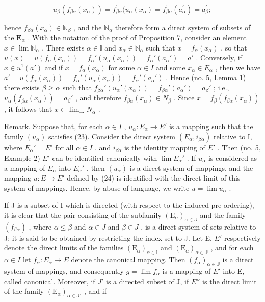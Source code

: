 \[
u _ {\beta} (f _ {\beta \alpha} (x _ {\alpha})) = f _ {\beta \alpha} ^ {\prime} (u _ {\alpha} (x _ {\alpha}) = f _ {\beta \alpha} ^ {\prime} (a _ {\alpha} ^ {\prime}) = a _ {\beta} ^ {\prime};
\]

hence \(f_{\beta \alpha}(x_{\alpha}) \in \mathbb{N}_{\beta}\) , and the \(\mathbb{N}_{\alpha}\) therefore form a direct system of subsets of the \(\mathbf{E}_{\alpha}\) . With the notation of the proof of Proposition 7, consider an element \(x \in \lim \mathbb{N}_{\alpha}\) . There exists \(\alpha \in \mathbb{I}\) and \(x_{\alpha} \in \mathbb{N}_{\alpha}\) such that \(x = f_{\alpha}(x_{\alpha})\) , so that \(u(x) = u(f_{\alpha}(x_{\alpha})) = f_{\alpha}'(u_{\alpha}(x_{\alpha})) = f_{\alpha}'(a_{\alpha}') = a'\) . Conversely, if \(x \in \overline{u}^1(a')\) and if \(x = f_\alpha(x_\alpha)\) for some \(\alpha \in I\) and some \(x_\alpha \in E_\alpha\) , then we have \(a' = u(f_\alpha(x_\alpha)) = f_\alpha'(u_\alpha(x_\alpha)) = f_\alpha'(a_\alpha')\) . Hence (no. 5, Lemma 1) there exists \(\beta \geqslant \alpha\) such that \(f_{\beta\alpha}'(u_\alpha'(x_\alpha)) = f_{\beta\alpha}'(a_\alpha') = a_\beta'\) ; i.e., \(u_\alpha(f_{\beta\alpha}(x_\alpha)) = a_\beta'\) , and therefore \(f_{\beta\alpha}(x_\alpha) \in N_\beta\) . Since \(x = f_\beta(f_{\beta\alpha}(x_\alpha))\) , it follows that \(x \in \lim_{\rightarrow} N_\alpha\) .

Remark. Suppose that, for each \(\alpha \in I\) , \(u_{\alpha}: E_{\alpha} \to E'\) is a mapping such that the family \((u_{\alpha})\) satisfies (23). Consider the direct system \((E_{\alpha}, i_{\beta \alpha})\) relative to I, where \(E_{\alpha}' = E'\) for all \(\alpha \in I\) , and \(i_{\beta \alpha}\) is the identity mapping of \(E'\) . Then (no. 5, Example 2) \(E'\) can be identified canonically with \(\lim E_{\alpha}'\) . If \(u_{\alpha}\) is considered as a mapping of \(E_{\alpha}\) into \(E_{\alpha}'\) , then \((u_{\alpha})\) is a direct system of mappings, and the mapping \(u: E \to E'\) defined by (24) is identified with the direct limit of this system of mappings. Hence, by abuse of language, we write \(u = \lim u_{\alpha}\) .

If J is a subset of I which is directed (with respect to the induced pre-ordering), it is clear that the pair consisting of the subfamily \((\mathrm{E}_{\alpha})_{\alpha\in\mathbb{J}}\) and the family \((f_{\beta\alpha})\) , where \(\alpha\leqslant\beta\) and \(\alpha\in J\) and \(\beta\in J\) , is a direct system of sets relative to J; it is said to be obtained by restricting the index set to J. Let E, \(E'\) respectively denote the direct limits of the families \((\mathrm{E}_{\alpha})_{\alpha\in\mathbb{I}}\) and \((\mathrm{E}_{\alpha})_{\alpha\in\mathbb{J}}\) , and for each \(\alpha\in I\) let \(f_{\alpha}:E_{\alpha}\to E\) denote the canonical mapping. Then \((f_{\alpha})_{\alpha\in\mathbb{J}}\) is a direct system of mappings, and consequently \(g=\lim f_{\alpha}\) is a mapping of \(E'\) into E, called canonical. Moreover, if \(J'\) is a directed subset of J, if \(E''\) is the direct limit of the family \((\mathrm{E}_{\alpha})_{\alpha\in\mathbb{J}'}\) , and if

